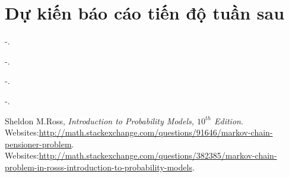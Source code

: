 \documentclass[12pt,a4paper]{article}
\begin{document}
\section{Dự kiến báo cáo tiến độ tuần sau }
\textrm{-}.\par
\textrm{-}.\par
\textrm{-}.\par
\textrm{-}.\par
\newpage

\begin{thebibliography}{39}
Sheldon M.Ross,
\textit{Introduction to Probability Models, $10^{th}$ Edition}.
Websites:\url{http://math.stackexchange.com/questions/91646/markov-chain-pensioner-problem}.
Websites:\url{http://math.stackexchange.com/questions/382385/markov-chain-problem-in-rosss-introduction-to-probability-models}.
\end{thebibliography}
\end{document}
